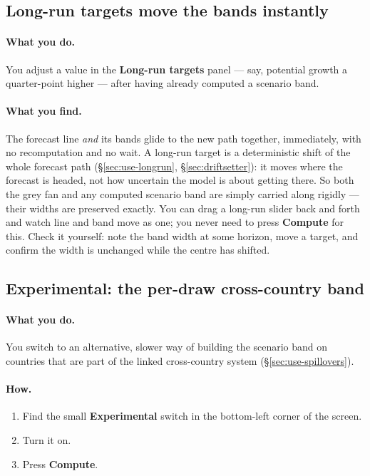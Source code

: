 \documentclass[11pt]{article}
\theoremstyle{definition}
\theoremstyle{remark}
\begin{document}
\subsection{Long-run targets move the bands instantly}

\paragraph{What you do.} You adjust a value in the \textbf{Long-run targets} panel ---
say, potential growth a quarter-point higher --- after having already computed a
scenario band.

\paragraph{What you find.} The forecast line \emph{and} its bands glide to the new
path together, immediately, with no recomputation and no wait. A long-run target is a
deterministic shift of the whole forecast path (\S\ref{sec:use-longrun},
\S\ref{sec:driftsetter}): it moves where the forecast is headed, not how uncertain the
model is about getting there. So both the grey fan and any computed scenario band are
simply carried along rigidly --- their widths are preserved exactly. You can drag a
long-run slider back and forth and watch line and band move as one; you never need to
press \textbf{Compute} for this. Check it yourself: note the band width at some
horizon, move a target, and confirm the width is unchanged while the centre has
shifted.

\subsection{Experimental: the per-draw cross-country band}

\paragraph{What you do.} You switch to an alternative, slower way of building the
scenario band on countries that are part of the linked cross-country system
(\S\ref{sec:use-spillovers}).

\paragraph{How.}
\begin{enumerate}
  \item Find the small \textbf{Experimental} switch in the bottom-left corner of the
    screen.
  \item Turn it on.
  \item Press \textbf{Compute}.
\end{enumerate}
\end{document}
